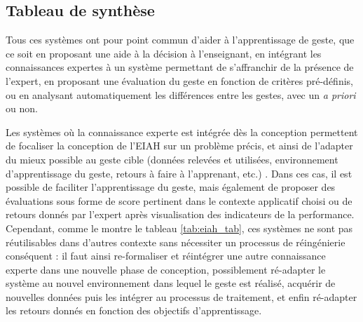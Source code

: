 
\subsection{Tableau de synthèse}
Tous ces systèmes ont pour point commun d'aider à l'apprentissage de geste, que ce soit en proposant une aide à la décision à l'enseignant, en intégrant les connaissances expertes à un système permettant de s'affranchir de la présence de l'expert, en proposant une évaluation du geste en fonction de critères pré-définis, ou en analysant automatiquement les différences entre les gestes, avec un \textit{a priori} ou non.

Les systèmes où la connaissance experte est intégrée dès la conception permettent de focaliser la conception de l'EIAH sur un problème précis, et ainsi de l'adapter du mieux possible au geste cible (données relevées et utilisées, environnement d'apprentissage du geste, retours à faire à l'apprenant, etc.) \parencite{Baldominos2015AAt, Alankus2010TCG, Gameiro2014KST, BMT_2015, LeNaour2019S3V}. Dans ces cas, il est possible de faciliter l'apprentissage du geste, mais également de proposer des évaluations sous forme de score pertinent dans le contexte applicatif choisi ou de retours donnés par l'expert après visualisation des indicateurs de la performance. Cependant, comme le montre le tableau \ref{tab:eiah_tab}, ces systèmes ne sont pas réutilisables dans d'autres contexte sans nécessiter un processus de réingénierie conséquent : il faut ainsi re-formaliser et réintégrer une autre connaissance experte dans une nouvelle phase de conception, possiblement ré-adapter le système au nouvel environnement dans lequel le geste est réalisé, acquérir de nouvelles données puis les intégrer au processus de traitement, et enfin ré-adapter les retours donnés en fonction des objectifs d'apprentissage.

